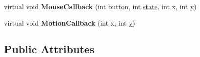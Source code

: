 \begin{DoxyCompactItemize}
\item 
\hypertarget{class_complete_box_pruning_test_a892677fee4ae0fea39e5df29bf7be7db}{virtual void {\bfseries Mouse\+Callback} (int button, int \hyperlink{structstate}{state}, int x, int \hyperlink{_ice_utils_8h_aa7ffaed69623192258fb8679569ff9ba}{y})}\label{class_complete_box_pruning_test_a892677fee4ae0fea39e5df29bf7be7db}

\item 
\hypertarget{class_complete_box_pruning_test_a4002089cab7ed23b3b815912f95aa6c5}{virtual void {\bfseries Motion\+Callback} (int x, int \hyperlink{_ice_utils_8h_aa7ffaed69623192258fb8679569ff9ba}{y})}\label{class_complete_box_pruning_test_a4002089cab7ed23b3b815912f95aa6c5}

\end{DoxyCompactItemize}
\subsection*{Public Attributes}
